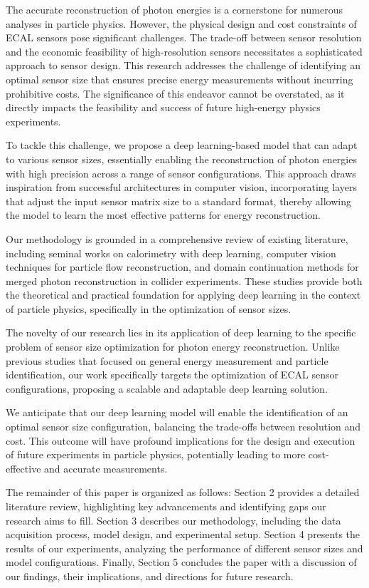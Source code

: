 \documentclass[conference]{IEEEtran}
\begin{document}
The accurate reconstruction of photon energies is a cornerstone for numerous analyses in particle physics. However, the physical design and cost constraints of ECAL sensors pose significant challenges. The trade-off between sensor resolution and the economic feasibility of high-resolution sensors necessitates a sophisticated approach to sensor design. This research addresses the challenge of identifying an optimal sensor size that ensures precise energy measurements without incurring prohibitive costs. The significance of this endeavor cannot be overstated, as it directly impacts the feasibility and success of future high-energy physics experiments.

To tackle this challenge, we propose a deep learning-based model that can adapt to various sensor sizes, essentially enabling the reconstruction of photon energies with high precision across a range of sensor configurations. This approach draws inspiration from successful architectures in computer vision, incorporating layers that adjust the input sensor matrix size to a standard format, thereby allowing the model to learn the most effective patterns for energy reconstruction.

Our methodology is grounded in a comprehensive review of existing literature, including seminal works on calorimetry with deep learning, computer vision techniques for particle flow reconstruction, and domain continuation methods for merged photon reconstruction in collider experiments. These studies provide both the theoretical and practical foundation for applying deep learning in the context of particle physics, specifically in the optimization of sensor sizes.

The novelty of our research lies in its application of deep learning to the specific problem of sensor size optimization for photon energy reconstruction. Unlike previous studies that focused on general energy measurement and particle identification, our work specifically targets the optimization of ECAL sensor configurations, proposing a scalable and adaptable deep learning solution.

We anticipate that our deep learning model will enable the identification of an optimal sensor size configuration, balancing the trade-offs between resolution and cost. This outcome will have profound implications for the design and execution of future experiments in particle physics, potentially leading to more cost-effective and accurate measurements.

The remainder of this paper is organized as follows: Section 2 provides a detailed literature review, highlighting key advancements and identifying gaps our research aims to fill. Section 3 describes our methodology, including the data acquisition process, model design, and experimental setup. Section 4 presents the results of our experiments, analyzing the performance of different sensor sizes and model configurations. Finally, Section 5 concludes the paper with a discussion of our findings, their implications, and directions for future research.
\end{document}
